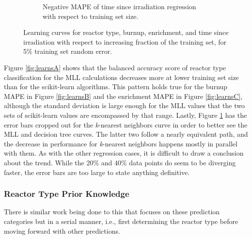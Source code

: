 \begin{figure}[!htb]
\begin{subfigure}[b]{0.49\textwidth}
    \caption{Negative \gls{MAPE} of time since irradiation regression with 
             respect to training set size.}
    \label{fig:learnsD}
  \end{subfigure}
  \caption{Learning curves for reactor type, burnup, enrichment, and time 
           since irradiation with respect to increasing fraction of the 
           training set, for 5\% training set random error.}
  \label{fig:learns}
\end{figure}

Figure \ref{fig:learnsA} shows that the balanced accuracy score of reactor type
classification for the \gls{MLL} calculations decreases more at lower training
set size than for the scikit-learn algorithms.  This pattern holds true for the
burnup \gls{MAPE} in Figure \ref{fig:learnsB} and the enrichment \gls{MAPE} in
Figure \ref{fig:learnsC}, although the standard deviation is large enough for
the \gls{MLL} values that the two sets of scikit-learn values are encompassed
by that range. Lastly, Figure \ref{fig:learnsD} has the error bars cropped out
for the \textit{k}-nearest neighbors curve in order to better see the \gls{MLL}
and decision tree curves. The latter two follow a nearly equivalent path, and
the decrease in performance for \textit{k}-nearest neighbors happens mostly in
parallel with them. As with the other regression cases, it is difficult to draw
a conclusion about the trend. While the 20\% and 40\% data points do seem to be
diverging faster, the error bars are too large to state anything definitive.

\subsubsection{Reactor Type Prior Knowledge}

There is similar work being done  to this that focuses
on these prediction categories but in a serial manner, i.e., first determining
the reactor type before moving forward with other predictions. 

